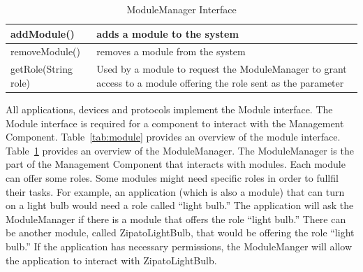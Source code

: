 \begin{table}
\begin{center}
\begin{tabular}{| p{4cm} | p{3cm} |}
\hline
addModule() & adds a module to the system \\ \hline
removeModule() & removes a module from the system \\ \hline
getRole(String role) & Used by a module to request the ModuleManager to grant
access to a module offering the role sent as the parameter  \\ \hline
\end{tabular}
\end{center}
\caption{ModuleManager Interface}
\label{tab:modulemanager}
\end{table}
All applications, devices and protocols implement the Module interface. The
Module interface is required for a component to interact with the Management 
Component. Table~\ref{tab:module} provides an overview of the module interface.
Table~\ref{tab:modulemanager} provides an overview of the ModuleManager.
The ModuleManager is the part of the Management Component that interacts with
modules. Each module can offer some roles. Some modules might need specific
roles in order to fullfil their tasks. For example, an application (which is
also a module) that can turn on a light bulb would need a role called ``light
bulb.'' The application will ask the ModuleManager if there is a module that
offers the role ``light bulb.'' There can be another module, called
ZipatoLightBulb, that would be offering the role ``light bulb.'' If the
application has necessary permissions, the ModuleManger will allow the
application to interact with ZipatoLightBulb.
